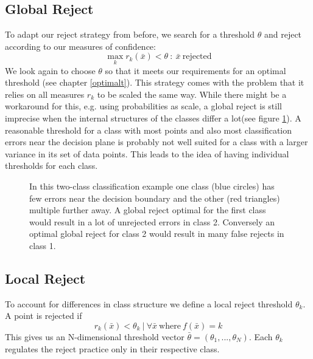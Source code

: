 \subsection{Global Reject}
To adapt our reject strategy from before, we search for a threshold $\theta$ and reject according to our measures of confidence:
$$ \operatorname*{max}_k r_k(\bar{x}) < \theta \ : \ \bar{x} \ \text{rejected}  $$
We look again to choose $\theta$ so that it meets our requirements for an optimal threshold (see chapter \ref{optimalt}). This strategy comes with the problem that it relies on all measures $r_k$ to be scaled the same way. While there might be a workaround for this, e.g. using probabilities as scale, a global reject is still imprecise when the internal structures of the classes differ a lot(see figure \ref{classStructure}). A reasonable threshold for a class with most points and also most classification errors near the decision plane is probably not well suited for a class with a larger variance in its set of data points. This leads to the idea of having individual thresholds for each class.

\begin{figure}[!htbp]
\centering
\caption{In this two-class classification example one class (blue circles) has few errors near the decision boundary and the other (red triangles) multiple further away. A global reject optimal for the first class would result in a lot of unrejected errors in class 2. Conversely an optimal global reject for class 2 would result in many false rejects in class 1.}
\label{classStructure}
\end{figure}

\subsection{Local Reject}
\label{localreject}
To account for differences in class structure we define a local reject threshold $\theta_k$. A point is rejected if
$$ r_k(\bar{x}) < \theta_k \ | \ \forall \bar{x} \  \text{where} \ f(\bar{x}) = k $$
This gives us an N-dimensional threshold vector $\bar{\theta} = (\theta_1,...,\theta_N)$. Each $\theta_k$ regulates the reject practice only in their respective class.

